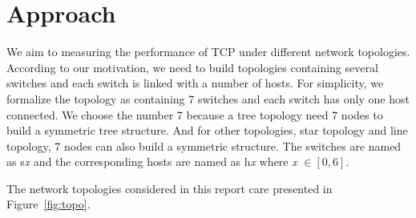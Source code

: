 \section{Approach} \label{sec:approach}

We aim to measuring the performance of TCP under different network topologies.
According to our motivation, we need to build topologies containing several
switches and each switch is linked with a number of hosts. For simplicity,
we formalize the topology as containing 7 switches and each switch has only 
one host connected. We choose the number 7 because a tree topology need 7 nodes
to build a symmetric tree structure. And for other topologies, \eg star topology
and line topology, 7 nodes can also build a symmetric structure. The switches are named
as s{\it x} and the corresponding hosts are named as h{\it x} where {\it x} $\in [0, 6]$.

The network topologies considered in this report care presented in Figure~\ref{fig:topo}.

